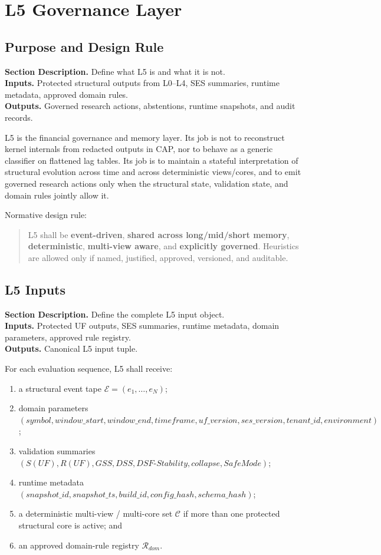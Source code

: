 \documentclass[11pt]{report}
\newcommand{\E}{\mathcal{E}}
\newcommand{\meta}[3]{\textbf{Section Description.} #1\\
\textbf{Inputs.} #2\\
\textbf{Outputs.} #3\par}
\begin{document}
\chapter{L5 Governance Layer}
\section{Purpose and Design Rule}
\meta{Define what L5 is and what it is not.}{Protected structural outputs from L0--L4, SES summaries, runtime metadata, approved domain rules.}{Governed research actions, abstentions, runtime snapshots, and audit records.}

L5 is the financial governance and memory layer. Its job is not to reconstruct kernel internals from redacted outputs in CAP, nor to behave as a generic classifier on flattened lag tables. Its job is to maintain a stateful interpretation of structural evolution across time and across deterministic views/cores, and to emit governed research actions only when the structural state, validation state, and domain rules jointly allow it.

Normative design rule:
\begin{quote}
L5 shall be \textbf{event-driven}, \textbf{shared across long/mid/short memory}, \textbf{deterministic}, \textbf{multi-view aware}, and \textbf{explicitly governed}. Heuristics are allowed only if named, justified, approved, versioned, and auditable.
\end{quote}

\section{L5 Inputs}
\meta{Define the complete L5 input object.}{Protected UF outputs, SES summaries, runtime metadata, domain parameters, approved rule registry.}{Canonical L5 input tuple.}

For each evaluation sequence, L5 shall receive:
\begin{enumerate}[leftmargin=1.2cm]
    \item a structural event tape $\E=(e_1,\dots,e_N)$;
    \item domain parameters $(symbol, window\_start, window\_end, timeframe, uf\_version, ses\_version, tenant\_id, environment)$;
    \item validation summaries $(S(UF),R(UF),GSS,DSS,DSF\text{-}Stability,collapse,SafeMode)$;
    \item runtime metadata $(snapshot\_id, snapshot\_ts, build\_id, config\_hash, schema\_hash)$;
    \item a deterministic multi-view / multi-core set $\mathcal{C}$ if more than one protected structural core is active; and
    \item an approved domain-rule registry $\mathcal{R}_{dom}$.
\end{enumerate}
\end{document}
